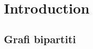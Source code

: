 \documentclass[../template]{subfiles}
\begin{document}
\section{Introduction}
\subsection{Grafi bipartiti}

\end{document}
